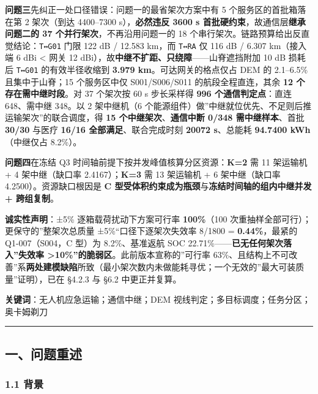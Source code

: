 \documentclass[
  10.5pt,
]{extarticle}
\begin{document}
\textbf{问题三}先纠正一处口径错误：问题一的最省架次方案中有 5
个服务区的首批箱落在第 2 架次（到达 4400--7300 s），\textbf{必然违反
3600 s 首批硬约束}，故通信层\textbf{继承问题二的 37
个并行架次}，不再沿用问题一的 18
个串行架次。链路预算给出反直觉结论：\texttt{T↔G01} 门限 122 dB / 12.583
km，而 \texttt{T↔RA} 仅 116 dB / 6.307 km（接入端 6 dBi \textless{} 网关
12 dBi），故\textbf{中继不扩距、只绕障}------山脊遮挡附加 10 dB 损耗后
\texttt{T↔G01} 的有效半径收缩到 \textbf{3.979 km}。可达网关的格点仅占
DEM 的 2.1--6.5\% 且集中于山脊；15 个服务区中仅 S001/S006/S011
的航段全程直连，其余 \textbf{12 个存在需中继时段}。对 37 个架次按 60 s
步长采样得 \textbf{996 个通信判定点}：直连 648、需中继 348。以 2
架中继机（6
个能源组件）做''中继就位优先、不足则后推运输架次''的联合调度，得
\textbf{15 个中继架次}、\textbf{通信中断 0/348 需中继样本}、首批
\textbf{30/30} 与医疗 \textbf{16/16 全部满足}、联合完成时刻
\textbf{20072 s}、总能耗 \textbf{94.7400 kWh}（中继仅占 8.2\%）。

\textbf{问题四}在冻结 Q3
时间轴前提下按并发峰值核算分区资源：\textbf{K=2} 需 11 架运输机 + 4
架中继（缺口率 2.4167）；\textbf{K=3} 需 13 架运输机 + 6 架中继（缺口率
4.2500）。资源缺口根因是 \textbf{C
型受体积约束成为瓶颈}与\textbf{冻结时间轴的组内中继并发 + 跨组复制}。

\textbf{诚实性声明}：±5\% 逐箱载荷扰动下方案可行率 \textbf{100\%}（100
次重抽样全部可行）；更保守的''整架次总质量 ±5\%``口径下逐架次失效率
8/1800 = \textbf{0.44\%}，最紧的 Q1-007（S004，C 型）为 8.2\%、基准返航
SOC 22.71\%------\textbf{已无任何架次落入''失效率
\textgreater10\%''的脆弱区}。此前版本宣称的''可行率
63\%、且结构上不可改善''系\textbf{两处建模缺陷}所致（最小架次数内未做能耗寻优；一个无效的''最大可装质量''证明），已在
§4.2.3 与 §6.2 中更正并复算。

\textbf{关键词}：无人机应急运输；通信中继；DEM
视线判定；多目标调度；任务分区；奥卡姆剃刀

\begin{center}\rule{0.5\linewidth}{0.5pt}\end{center}

\subsection{一、问题重述}\label{ux4e00ux95eeux9898ux91cdux8ff0}

\subsubsection{1.1 背景}\label{ux80ccux666f}
\end{document}
